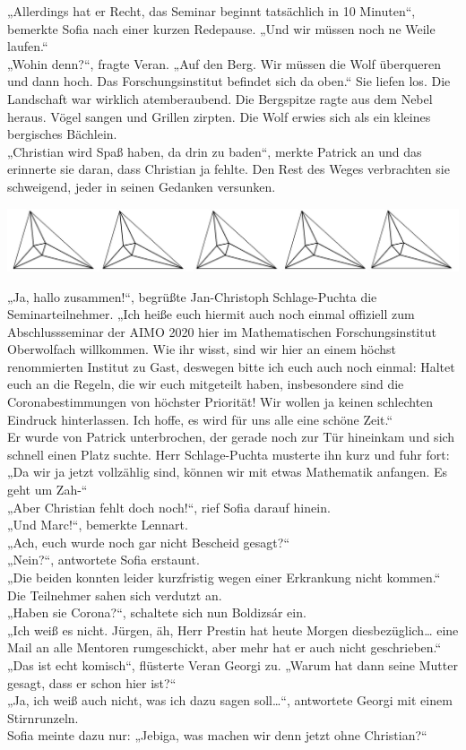\documentclass[oneside]{memoir}
\newcommand{\parasep}{
\bigskip
\bigskip
\begin{center} 
   \includegraphics[scale=.08]{parasep5.jpg} 
\end{center}
\bigskip
\bigskip
}
\begin{document}
„Allerdings hat er Recht, das Seminar beginnt tatsächlich in 10 Minuten“, bemerkte Sofia nach einer kurzen Redepause. „Und wir müssen noch ne Weile laufen.“  \\
„Wohin denn?“, fragte Veran. „Auf den Berg. Wir müssen die Wolf überqueren und dann hoch. Das Forschungsinstitut befindet sich da oben.“ Sie liefen los. Die Landschaft war wirklich atemberaubend. Die Bergspitze ragte aus dem Nebel heraus. Vögel sangen und Grillen zirpten. Die Wolf erwies sich als ein kleines bergisches Bächlein.  \\
„Christian wird Spaß haben, da drin zu baden“, merkte Patrick an und das erinnerte sie daran, dass Christian ja fehlte. Den Rest des Weges verbrachten sie schweigend, jeder in seinen Gedanken versunken.

\parasep

\noindent „Ja, hallo zusammen!“, begrüßte Jan-Christoph Schlage-Puchta die Seminarteilnehmer. „Ich heiße euch hiermit auch noch einmal offiziell zum Abschlussseminar der AIMO 2020 hier im Mathematischen Forschungsinstitut Oberwolfach willkommen. Wie ihr wisst, sind wir hier an einem höchst renommierten Institut zu Gast, deswegen bitte ich euch auch noch einmal: Haltet euch an die Regeln, die wir euch mitgeteilt haben, insbesondere sind die Coronabestimmungen von höchster Priorität! Wir wollen ja keinen schlechten Eindruck hinterlassen. Ich hoffe, es wird für uns alle eine schöne Zeit.“ \\
Er wurde von Patrick unterbrochen, der gerade noch zur Tür hineinkam und sich schnell einen Platz suchte. Herr Schlage-Puchta musterte ihn kurz und fuhr fort: „Da wir ja jetzt vollzählig sind, können wir mit etwas Mathematik anfangen. Es geht um Zah-“ \\
„Aber Christian fehlt doch noch!“, rief Sofia darauf hinein. \\
„Und Marc!“, bemerkte Lennart. \\
„Ach, euch wurde noch gar nicht Bescheid gesagt?“ \\
„Nein?“, antwortete Sofia erstaunt. \\
„Die beiden konnten leider kurzfristig wegen einer Erkrankung nicht kommen.“ \\
Die Teilnehmer sahen sich verdutzt an. \\
„Haben sie Corona?“, schaltete sich nun Boldizsár ein. \\
„Ich weiß es nicht. Jürgen, äh, Herr Prestin hat heute Morgen diesbezüglich\ldots{} eine Mail an alle Mentoren rumgeschickt, aber mehr hat er auch nicht geschrieben.“ \\
„Das ist echt komisch“, flüsterte Veran Georgi zu. „Warum hat dann seine Mutter gesagt, dass er schon hier ist?“ \\
„Ja, ich weiß auch nicht, was ich dazu sagen soll\ldots“, antwortete Georgi mit einem Stirnrunzeln. \\
Sofia meinte dazu nur: „Jebiga, was machen wir denn jetzt ohne Christian?“
\end{document}
